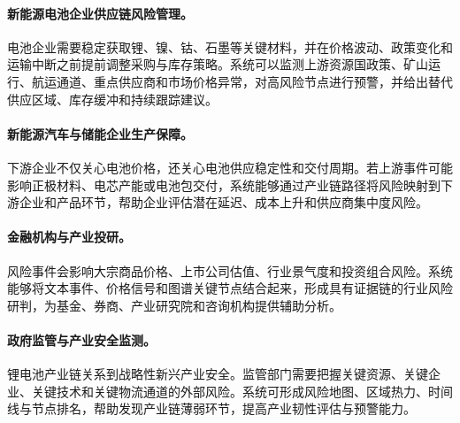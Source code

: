 \documentclass[12pt,a4paper]{article}
\begin{document}
\paragraph{新能源电池企业供应链风险管理。}电池企业需要稳定获取锂、镍、钴、石墨等关键材料，并在价格波动、政策变化和运输中断之前提前调整采购与库存策略。系统可以监测上游资源国政策、矿山运行、航运通道、重点供应商和市场价格异常，对高风险节点进行预警，并给出替代供应区域、库存缓冲和持续跟踪建议。

\paragraph{新能源汽车与储能企业生产保障。}下游企业不仅关心电池价格，还关心电池供应稳定性和交付周期。若上游事件可能影响正极材料、电芯产能或电池包交付，系统能够通过产业链路径将风险映射到下游企业和产品环节，帮助企业评估潜在延迟、成本上升和供应商集中度风险。

\paragraph{金融机构与产业投研。}风险事件会影响大宗商品价格、上市公司估值、行业景气度和投资组合风险。系统能够将文本事件、价格信号和图谱关键节点结合起来，形成具有证据链的行业风险研判，为基金、券商、产业研究院和咨询机构提供辅助分析。

\paragraph{政府监管与产业安全监测。}锂电池产业链关系到战略性新兴产业安全。监管部门需要把握关键资源、关键企业、关键技术和关键物流通道的外部风险。系统可形成风险地图、区域热力、时间线与节点排名，帮助发现产业链薄弱环节，提高产业韧性评估与预警能力。
\end{document}
